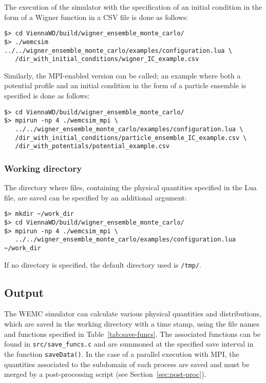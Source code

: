 
The execution of the simulator with the specification of an initial condition in the form of a Wigner function in a CSV file is done as follows:
\begin{lstlisting}
$> cd ViennaWD/build/wigner_ensemble_monte_carlo/
$> ./wemcsim ../../wigner_ensemble_monte_carlo/examples/configuration.lua \
   /dir_with_initial_conditions/wigner_IC_example.csv
\end{lstlisting}
Similarly, the MPI-enabled version can be called; an example where both a potential profile and an initial condition in the form of a particle ensemble is specified is done as follows:
\begin{lstlisting}
$> cd ViennaWD/build/wigner_ensemble_monte_carlo/
$> mpirun -np 4 ./wemcsim_mpi \
   ../../wigner_ensemble_monte_carlo/examples/configuration.lua \
   /dir_with_initial_conditions/particle_ensemble_IC_example.csv \
   /dir_with_potentials/potential_example.csv
\end{lstlisting}


\subsubsection{Working directory}
The directory where files, containing the physical quantities specified in the Lua file, are saved can be specified by an additional argument:

\begin{lstlisting}
$> mkdir ~/work_dir
$> cd ViennaWD/build/wigner_ensemble_monte_carlo/
$> mpirun -np 4 ./wemcsim_mpi \
   ../../wigner_ensemble_monte_carlo/examples/configuration.lua ~/work_dir
\end{lstlisting}

If no directory is specified, the default directory used is \texttt{/tmp/}.

\subsection{Output}

The WEMC simulator can calculate various physical quantities and distributions, which are saved in the working directory with a time stamp, using the file names and functions specified in Table~\ref{tab:save-funcs}. The associated functions can be found in \texttt{src/save\_funcs.c} and are summoned at the specified save interval in the function \texttt{saveData()}. In the case of a parallel execution with MPI, the quantities associated to the subdomain of each process are saved and must be merged by a post-processing script (see Section~\ref{sec:post-proc}).

